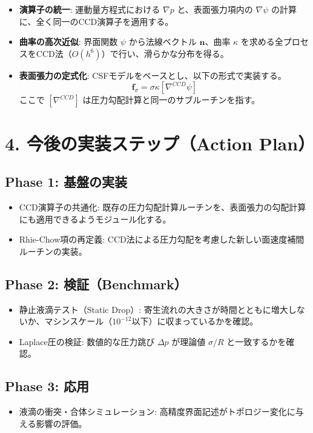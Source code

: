 \documentclass[12pt, a4paper, titlepage]{article}
\begin{document}
\begin{itemize}
    \item \textbf{演算子の統一}: 運動量方程式における $\nabla p$ と、表面張力項内の $\nabla \psi$ の計算に、全く同一のCCD演算子を適用する。
    \item \textbf{曲率の高次近似}: 界面関数 $\psi$ から法線ベクトル $\mathbf{n}$、曲率 $\kappa$ を求める全プロセスをCCD法（$O(h^6)$）で行い、滑らかな分布を得る。
    \item \textbf{表面張力の定式化}: CSFモデルをベースとし、以下の形式で実装する。
    \begin{equation*}
        \mathbf{f}_\sigma = \sigma \kappa [ \nabla^{CCD} \psi ]
    \end{equation*}
    ここで $[ \nabla^{CCD} ]$ は圧力勾配計算と同一のサブルーチンを指す。
\end{itemize}

\section*{4. 今後の実装ステップ（Action Plan）}

\subsection*{Phase 1: 基盤の実装}
\begin{itemize}
    \item [ ] CCD演算子の共通化: 既存の圧力勾配計算ルーチンを、表面張力の勾配計算にも適用できるようモジュール化する。
    \item [ ] Rhie-Chow項の再定義: CCD法による圧力勾配を考慮した新しい面速度補間ルーチンの実装。
\end{itemize}

\subsection*{Phase 2: 検証（Benchmark）}
\begin{itemize}
    \item [ ] 静止液滴テスト（Static Drop）: 寄生流れの大きさが時間とともに増大しないか、マシンスケール（$10^{-12}$以下）に収まっているかを確認。
    \item [ ] Laplace圧の検証: 数値的な圧力跳び $\Delta p$ が理論値 $\sigma/R$ と一致するかを確認。
\end{itemize}

\subsection*{Phase 3: 応用}
\begin{itemize}
    \item [ ] 液滴の衝突・合体シミュレーション: 高精度界面記述がトポロジー変化に与える影響の評価。
\end{itemize}
\end{document}
